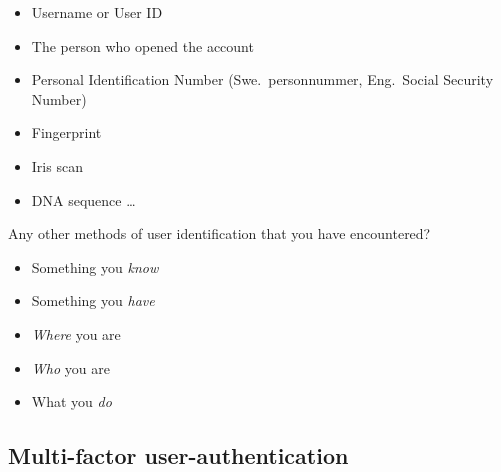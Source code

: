 \begin{frame}
  \begin{example}[Identifiers]
    \begin{itemize}
      \item Username or User ID
      \item The person who opened the account
      \item Personal Identification Number (Swe.\ personnummer, Eng.\ Social 
        Security Number)

        \pause{}

      \item Fingerprint
      \item Iris scan
      \item DNA sequence \dots
    \end{itemize}
  \end{example}

  \pause{}

  \begin{exercise}
    Any other methods of user identification that you have encountered?
  \end{exercise}
\end{frame}

\begin{frame}
  \begin{example}
    \begin{itemize}
      \item Something you \emph{know}

        \pause{}

      \item Something you \emph{have}

        \pause{}

      \item \emph{Where} you are

        \pause{}

      \item \emph{Who} you are
      \item What you \emph{do}
    \end{itemize}
  \end{example}
\end{frame}

\subsection{Multi-factor user-authentication}

